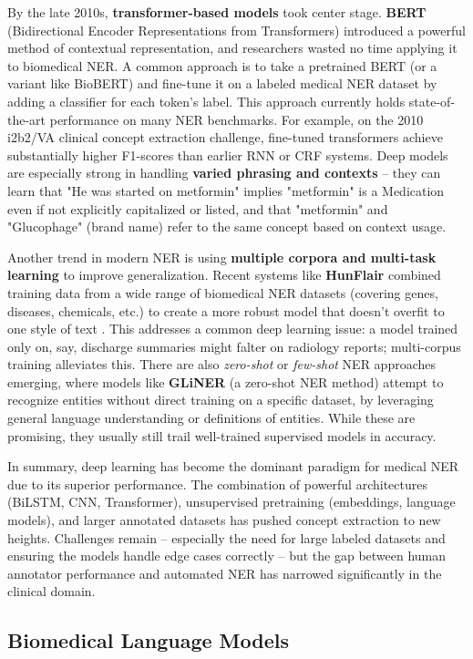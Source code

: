 By the late 2010s, \textbf{transformer-based models} took center stage. \textbf{BERT} (Bidirectional Encoder Representations from Transformers) introduced a powerful method of contextual representation, and researchers wasted no time applying it to biomedical NER. A common approach is to take a pretrained BERT (or a variant like BioBERT) and fine-tune it on a labeled medical NER dataset by adding a classifier for each token's label. This approach currently holds state-of-the-art performance on many NER benchmarks. For example, on the 2010 i2b2/VA clinical concept extraction challenge, fine-tuned transformers achieve substantially higher F1-scores than earlier RNN or CRF systems. Deep models are especially strong in handling \textbf{varied phrasing and contexts} – they can learn that "He was started on metformin" implies "metformin" is a Medication even if not explicitly capitalized or listed, and that "metformin" and "Glucophage" (brand name) refer to the same concept based on context usage.

Another trend in modern NER is using \textbf{multiple corpora and multi-task learning} to improve generalization. Recent systems like \textbf{HunFlair} combined training data from a wide range of biomedical NER datasets (covering genes, diseases, chemicals, etc.) to create a more robust model that doesn't overfit to one style of text \cite{Weber2023}. This addresses a common deep learning issue: a model trained only on, say, discharge summaries might falter on radiology reports; multi-corpus training alleviates this. There are also \emph{zero-shot} or \emph{few-shot} NER approaches emerging, where models like \textbf{GLiNER} (a zero-shot NER method) attempt to recognize entities without direct training on a specific dataset, by leveraging general language understanding or definitions of entities. While these are promising, they usually still trail well-trained supervised models in accuracy.

In summary, deep learning has become the dominant paradigm for medical NER due to its superior performance. The combination of powerful architectures (BiLSTM, CNN, Transformer), unsupervised pretraining (embeddings, language models), and larger annotated datasets has pushed concept extraction to new heights. Challenges remain – especially the need for large labeled datasets and ensuring the models handle edge cases correctly – but the gap between human annotator performance and automated NER has narrowed significantly in the clinical domain.

\subsection{Biomedical Language Models}

